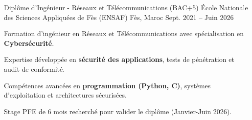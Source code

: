 
\begin{cventries}

  \cventry
  {Diplôme d'Ingénieur - Réseaux et Télécommunications (BAC+5)} %
  {École Nationale des Sciences Appliquées de Fès (ENSAF)} %
  {Fès, Maroc} %
  {Sept. 2021 – Juin 2026} %
  {
    \begin{cvitems} %
      \item {Formation d'ingénieur en Réseaux et Télécommunications avec spécialisation en \textbf{Cybersécurité}.}
      \item {Expertise développée en \textbf{sécurité des applications}, tests de pénétration et audit de conformité.}
      \item {Compétences avancées en \textbf{programmation (Python, C)}, systèmes d'exploitation et architectures sécurisées.}
      \item {Stage PFE de 6 mois recherché pour valider le diplôme (Janvier-Juin 2026).}
    \end{cvitems}
  }
\end{cventries}